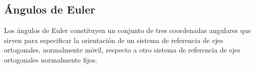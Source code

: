 \subsection{Ángulos de Euler}

Los ángulos de Euler constituyen un conjunto de tres coordenadas angulares que
sirven para especificar la orientación de un sistema de referencia de ejes
ortogonales, normalmente móvil, respecto a otro sistema de referencia de ejes
ortogonales normalmente fijos.